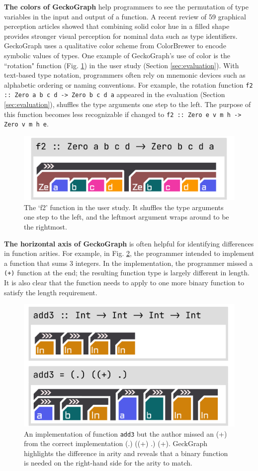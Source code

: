 \documentclass[preprint,12pt]{elsarticle}
\begin{document}
\textbf{The colors of GeckoGraph} help programmers to see the permutation of type variables in the input and output of a function. A recent review \cite{Zeng2023-jz} of 59 graphical perception articles showed that combining solid color hue in a filled shape provides stronger visual perception for nominal data such as type identifiers. GeckoGraph uses a qualitative color scheme from ColorBrewer \cite{Harrower2003-vu} to encode symbolic values of types. One example of GeckoGraph's use of color is the ``rotation" function  (Fig. \ref{fig:rotate}) in the user study (Section \ref{sec:evaluation}). With text-based type notation, programmers often rely on mnemonic devices such as alphabetic ordering or naming conventions. For example, the rotation function \texttt{f2 :: Zero a b c d -> Zero b c d a} appeared in the evaluation (Section \ref{sec:evaluation}), shuffles the type arguments one step to the left. The purpose of this function becomes less recognizable if changed to \texttt{f2 :: Zero e v m h -> Zero v m h e}. 

\begin{figure}[]
  \includegraphics[width=0.6\linewidth]{figures/rotate}
  \caption{\label{fig:rotate} The `f2' function in the user study. It shuffles the type arguments one step to the left, and the leftmost argument wraps around to be the rightmost.}
\end{figure}

\textbf{The horizontal axis of GeckoGraph} is often helpful for identifying differences in function arities. For example, in Fig. \ref{fig:add3}, the programmer intended to implement a function that sums 3 integers. In the implementation, the programmer missed a \texttt{(+)} function at the end; the resulting function type is largely different in length. It is also clear that the function needs to apply to one more binary function to satisfy the length requirement.  

\begin{figure}[h]
  \includegraphics[width=0.6\linewidth]{figures/Add3}
  \caption{\label{fig:add3} An implementation of function \texttt{add3} but the author missed an (+) from the correct implementation (.) ((+) .) (+). GeckGraph highlights the difference in arity and reveals that a binary function is needed on the right-hand side for the arity to match. }
\end{figure}
\end{document}
